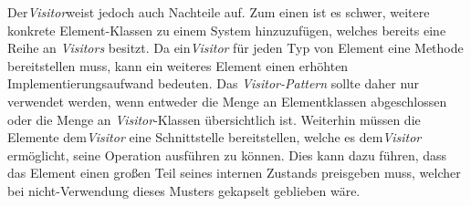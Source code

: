 Der\emph{Visitor}weist jedoch auch Nachteile auf. Zum einen ist es schwer, weitere konkrete Element-Klassen zu einem System hinzuzufügen, welches bereits eine Reihe an \emph{Visitors} besitzt. Da ein\emph{Visitor} für jeden Typ von Element eine Methode bereitstellen muss, kann ein weiteres Element einen erhöhten Implementierungsaufwand bedeuten. Das \emph{Visitor-Pattern} sollte daher nur verwendet werden, wenn entweder die Menge an Elementklassen abgeschlossen oder die Menge an \emph{Visitor}-Klassen übersichtlich ist. Weiterhin müssen die Elemente dem\emph{Visitor} eine Schnittstelle bereitstellen, welche es dem\emph{Visitor} ermöglicht, seine Operation ausführen zu können. Dies kann dazu führen, dass das Element einen großen Teil seines internen Zustands preisgeben muss, welcher bei nicht-Verwendung dieses Musters gekapselt geblieben wäre. \cite{gamma_design_1995}